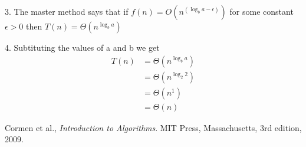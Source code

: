 \documentclass[a4paper,12pt]{article}
\begin{document}
3. The master method \cite[section 4.5]{cormen2009} says that if
               $f(n) = O(n^{(\log_b{a}-\epsilon)})$ for some constant $\epsilon > 0$ then
               $T(n) = \Theta(n^{\log_b{a}})$
               
4. Subtituting the values of a and b we get
\begin{align}
T(n) &= \Theta(n^{\log_b{a}}) \\
& = \Theta(n^{\log_2{2}}) \\
& = \Theta(n^1) \\
& = \Theta(n)
\end{align}

\begin{thebibliography}{9}

  Cormen et al.,
  \emph{Introduction to Algorithms}.
  MIT Press, Massachusetts,
  3rd edition,
  2009.

\end{thebibliography}
\end{document}
